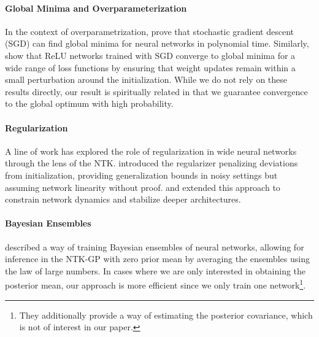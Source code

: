 \paragraph{Global Minima and Overparameterization} In the context of overparametrization, \citet{allenzhu2019convergence} prove that stochastic gradient descent (SGD) can find global minima for neural networks in polynomial time. Similarly, \citet{zou2020gradient} show that ReLU networks trained with SGD converge to global minima for a wide range of loss functions by ensuring that weight updates remain within a small perturbation around the initialization. While we do not rely on these results directly, our result is spiritually related in that we guarantee convergence to the global optimum with high probability.


\paragraph{Regularization} A line of work has explored the role of regularization in wide neural networks through the lens of the NTK. \citet{hu2020simpleeffectiveregularizationmethods} introduced the regularizer penalizing deviations from initialization, providing generalization bounds in noisy settings but assuming network linearity without proof. \citet{nitanda2020optimal} and \citet{suh2021non} extended this approach to constrain network dynamics and stabilize deeper architectures. 

\paragraph{Bayesian Ensembles} \citet{he2020bayesian} described a way of training Bayesian ensembles of neural networks, allowing for inference in the NTK-GP with zero prior mean by averaging the ensembles using the law of large numbers. In cases where we are only interested in obtaining the posterior mean, our approach is more efficient since we only train one network\footnote{They additionally provide a way of estimating the posterior covariance, which is not of interest in our paper.}.

